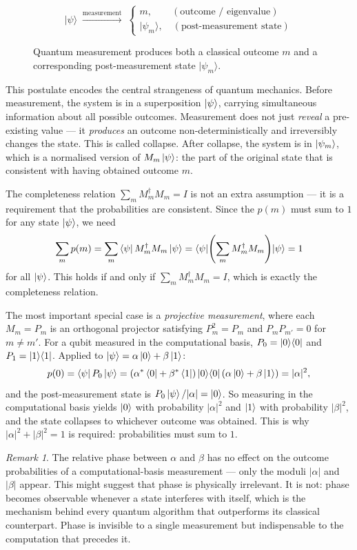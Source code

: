 \documentclass[12pt, a4paper, oneside]{report}
\theoremstyle{plain}
\theoremstyle{definition}
\theoremstyle{remark}
\newtheorem{remark}[theorem]{Remark}
\newcommand{\oket}[2]{\ket{#1}\!\bra{#2}}
\begin{document}
\begin{figure}[h]
	\centering
	\[
		|\psi\rangle
		\;\xrightarrow{\text{measurement}}\;
		\begin{cases}
			m, \qquad  (\text{outcome / eigenvalue}) \\
			|\psi_m\rangle, \quad (\text{post-measurement state})
		\end{cases}
	\]
	\caption{Quantum measurement produces both a classical outcome $m$ and a corresponding post-measurement state $|\psi_m\rangle$.}
	\label{fig:measurement}
\end{figure}

This postulate encodes the central strangeness of quantum mechanics. Before measurement,
the system is in a superposition $\ket{\psi}$, carrying simultaneous information about all
possible outcomes. Measurement does not just \emph{reveal} a pre-existing value --- it
\emph{produces} an outcome non-deterministically and irreversibly changes the state. This is
called collapse. After collapse, the system is in $\ket{\psi_m}$, which is a normalised
version of $M_m\ket{\psi}$: the part of the original state that is consistent with having
obtained outcome $m$.

The completeness relation $\sum_m M_m^\dagger M_m = I$ is not an extra assumption --- it is
a requirement that the probabilities are consistent. Since the $p(m)$ must sum to $1$ for
any state $\ket{\psi}$, we need
\[
	\sum_m p(m) = \sum_m \bra{\psi}M_m^\dagger M_m\ket{\psi}
	= \bra{\psi}\!\left(\sum_m M_m^\dagger M_m\right)\!\ket{\psi} = 1
\]
for all $\ket{\psi}$. This holds if and only if $\sum_m M_m^\dagger M_m = I$, which is
exactly the completeness relation.

The most important special case is a \emph{projective measurement}, where each $M_m = P_m$
is an orthogonal projector satisfying $P_m^2 = P_m$ and $P_m P_{m'} = 0$ for $m \neq m'$.
For a qubit measured in the computational basis, $P_0 = \oket{0}{0}$ and $P_1 = \oket{1}{1}$.
Applied to $\ket{\psi} = \alpha\ket{0} + \beta\ket{1}$:
\[
	p(0) = \bra{\psi}P_0\ket{\psi}
	= (\alpha^*\bra{0}+\beta^*\bra{1})\oket{0}{0}(\alpha\ket{0}+\beta\ket{1})
	= |\alpha|^2,
\]
and the post-measurement state is $P_0\ket{\psi}/|\alpha| = \ket{0}$. So measuring in the
computational basis yields $\ket{0}$ with probability $|\alpha|^2$ and $\ket{1}$ with
probability $|\beta|^2$, and the state collapses to whichever outcome was obtained. This is
why $|\alpha|^2 + |\beta|^2 = 1$ is required: probabilities must sum to $1$.

\begin{remark}
	The relative phase between $\alpha$ and $\beta$ has no effect on the outcome probabilities
	of a computational-basis measurement --- only the moduli $|\alpha|$ and $|\beta|$ appear.
	This might suggest that phase is physically irrelevant. It is not: phase becomes observable
	whenever a state interferes with itself, which is the mechanism behind every quantum
	algorithm that outperforms its classical counterpart. Phase is invisible to a single
	measurement but indispensable to the computation that precedes it.
\end{remark}
\end{document}
